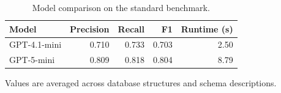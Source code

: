 \begin{table}[htbp]
\centering
\small
\caption{Model comparison on the standard benchmark.}
\label{tab:model-comparison-standard}
\begin{tabular}{lrrrr}
\toprule
Model & Precision & Recall & F1 & Runtime (s) \\
\midrule
GPT-4.1-mini & 0.710 & 0.733 & 0.703 & 2.50 \\
GPT-5-mini & 0.809 & 0.818 & 0.804 & 8.79 \\
\bottomrule
\end{tabular}
\par\footnotesize{Values are averaged across database structures and schema descriptions.}
\end{table}
